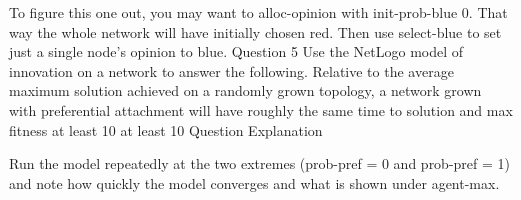 To figure this one out, you may want to alloc-opinion with init-prob-blue 0. That way the whole network 
will have initially chosen red. Then use select-blue to set just a single node's opinion to blue.
Question 5
Use the NetLogo model of innovation on a network to answer the following. Relative to the average maximum
solution achieved on a randomly grown topology, a network grown with preferential attachment will
have roughly the same time to solution and max fitness
at least 10%
at least 10%
Question Explanation

Run the model repeatedly at the two extremes (prob-pref = 0 and prob-pref = 1) and note how quickly the model converges and what is shown under agent-max.
